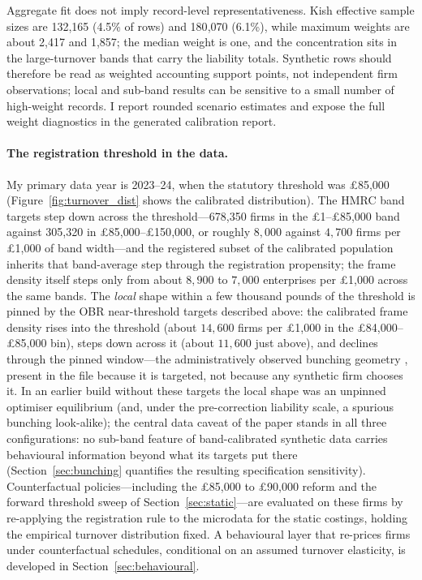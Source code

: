 Aggregate fit does not imply record-level representativeness. Kish effective
sample sizes are 132{,}165 (4.5\% of rows) and 180{,}070
(6.1\%), while maximum weights are about 2{,}417 and
1{,}857; the median weight is one, and the concentration sits in the
large-turnover bands that carry the liability totals. Synthetic rows should therefore be read
as weighted accounting support points, not independent firm observations;
local and sub-band results can be sensitive to a small number of high-weight
records. I report rounded scenario estimates and expose the full weight
diagnostics in the generated calibration report.

\paragraph{The registration threshold in the data.} My primary data year is
2023--24, when the statutory threshold was \pounds85{,}000
(Figure~\ref{fig:turnover_dist} shows the calibrated distribution). The HMRC band
targets step down across the threshold---678{,}350 firms in the
\pounds1--\pounds85{,}000 band against 305{,}320 in
\pounds85{,}000--\pounds150{,}000, or roughly $8{,}000$ against $4{,}700$ firms
per \pounds1{,}000 of band width---and the registered subset of the calibrated
population inherits that band-average step through the registration
propensity; the frame density itself steps only from about $8{,}900$ to
$7{,}000$ enterprises per \pounds1{,}000 across the same bands. The
\emph{local} shape within a few thousand pounds of the threshold is pinned by
the OBR near-threshold targets described above: the calibrated frame density
rises into the threshold (about $14{,}600$ firms per \pounds1{,}000 in the
\pounds84{,}000--\pounds85{,}000 bin), steps down across it (about $11{,}600$
just above), and declines through the pinned window---the
administratively observed bunching geometry \citep{obr2023vat,liuetal2021},
present in the file because it is targeted, not because any synthetic firm
chooses it. In an earlier build without these targets the local shape was an
unpinned optimiser equilibrium (and, under the pre-correction liability scale,
a spurious bunching look-alike); the central data caveat of the paper stands
in all three configurations: no sub-band feature of band-calibrated synthetic
data carries behavioural information beyond what its targets put there
(Section~\ref{sec:bunching} quantifies the resulting specification sensitivity).
Counterfactual policies---including the \pounds85{,}000 to \pounds90{,}000
reform and the forward threshold sweep of Section~\ref{sec:static}---are
evaluated on these firms by re-applying the registration rule to the microdata
for the static costings, holding the empirical turnover distribution fixed. A
behavioural layer that re-prices firms under counterfactual schedules,
conditional on an assumed turnover elasticity, is developed in
Section~\ref{sec:behavioural}.


